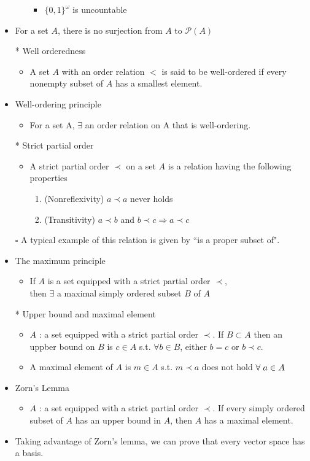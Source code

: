\documentclass[12pt]{article}
\newcommand{\sq}{$\square$}
\newcommand{\spone}{\hspace{0.1cm}}
\begin{document}
\begin{itemize}
\begin{enumerate}
		\begin{itemize}
			\item $\{0,1\}^\omega$ is uncountable
		\end{itemize}
	\end{enumerate}
	\item For a set $A$, there is no surjection from $A$ to $\mathcal{P}(A)$
	\item[*] Well orderedness
	\begin{itemize}
		\item A set $A$ with an order relation $<$ is said to be well-ordered if every nonempty subset of $A$ has a smallest element.
	\end{itemize}
	\item Well-ordering principle
	\begin{itemize}
		\item For a set A, $\exists$ an order relation on A that is well-ordering.
	\end{itemize}
	\item[*] Strict partial order
	\begin{itemize}
		\item A strict partial order $\prec$ on a set $A$ is a relation having the following properties
		\begin{enumerate}
			\item (Nonreflexivity) $a\prec a$ never holds
			\item (Transitivity) $a \prec b$ and $b \prec c \Rightarrow a\prec c$
		\end{enumerate}
	\end{itemize}
	\item[\sq] A typical example of this relation is given by ``is a proper subset of".
	\item The maximum principle
	\begin{itemize}
		\item If $A$ is a set equipped with a strict partial order $\prec$, \\then $\exists$ a maximal simply ordered subset $B$ of $A$
	\end{itemize}
	\item[*] Upper bound and maximal element
	\begin{itemize}
		\item $A$ : a set equipped with a strict partial order $\prec$. If $B\subset A$ then an uppber bound on $B$ is $c\in A$ s.t. $\forall b\in B$, either $b=c$ or $b\prec c$.
		\item A maximal element of $A$ is $m\in A$ s.t. $m\prec a$ does not hold $\forall \spone a\in A$
	\end{itemize}
	\item Zorn's Lemma
	\begin{itemize}
		\item $A$ : a set equipped with a strict partial order $\prec$. If every simply ordered subset of $A$ has an upper bound in $A$, then $A$ has a maximal element. 
	\end{itemize}
	\item Taking advantage of Zorn's lemma, we can prove that every vector space has a basis.
\end{itemize}
\clearpage
	
\end{document}
